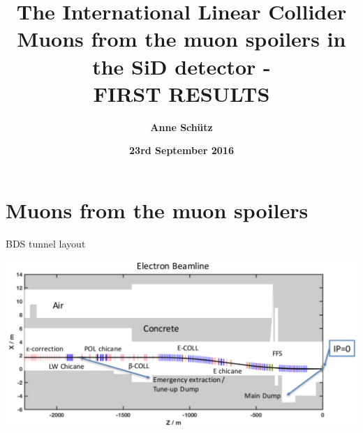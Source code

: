 \documentclass[xcolor={dvipsnames}]{beamer}
\title[ILC \& Muons from spoilers]{\textbf{\LARGE The International Linear Collider \\ \small Muons from the muon spoilers in the SiD detector - \\FIRST RESULTS}}
\author{\textbf{Anne Sch\"utz}}
\institute{\textbf{DESY}}
\date{\textbf{23rd September 2016}}
\begin{document}
{
\begin{frame}
  \titlepage
\end{frame}
}
\begin{frame}
  \tableofcontents
\end{frame}

\section{Muons from the muon spoilers}
\begin{frame}{BDS tunnel layout}
\begin{center}
\includegraphics[height=0.65\textheight]{BDS_electron_tunnel.pdf}
\end{center}
\end{frame}
\end{document}
